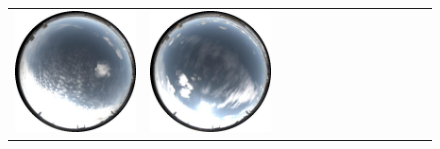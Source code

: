 \begin{figure}[!ht]
\begin{tabular}{@{}rcccccccccccc@{}}
    \includegraphics[width=\customwidth]{./figures/reconstruction/envmaps/20141011_112928.jpg} &
    \includegraphics[width=\customwidth]{./figures/reconstruction/envmaps/20141011_120128.jpg} &

\end{tabular}
\end{figure}
